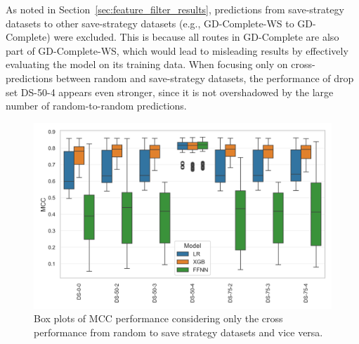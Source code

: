 As noted in Section~\ref{sec:feature_filter_results}, predictions from save-strategy datasets to other save-strategy datasets
(e.g., GD-Complete-WS to GD-Complete) were excluded. This is because all routes in GD-Complete are also part of GD-Complete-WS,
which would lead to misleading results by effectively evaluating the model on its training data. When focusing only on cross-predictions
between random and save-strategy datasets, the performance of drop set DS-50-4 appears even stronger, since it is not overshadowed by
the large number of random-to-random predictions.
\begin{figure}[ht]
	\centering
	\includegraphics[width = .85\textwidth]{pictures/feature_filter/cross_performance_boxplot.png}
	\caption{Box plots of MCC performance considering only the cross performance from random to save strategy datasets and vice versa.}
	\label{fig:mcc_filter_results_cross}
\end{figure}

